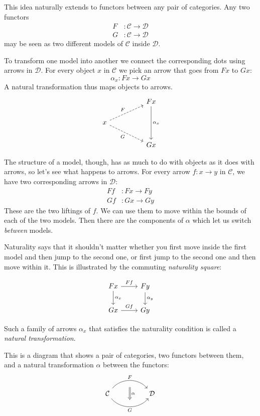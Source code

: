 \documentclass[DaoFP]{subfiles}
\begin{document}
This idea naturally extends to functors between any pair of categories. Any two functors
\begin{align*}
F &\colon \mathcal{C} \to \mathcal{D} \\
G &\colon \mathcal{C} \to \mathcal{D}
\end{align*}
may be seen as two different models of $\mathcal{C}$ inside $\mathcal{D}$. 

To transform one model into another we connect the corresponding dots using arrows in $\mathcal{D}$. For every object $x$ in $\mathcal{C}$ we pick an arrow that goes from $F x$ to $G x$:
\[ \alpha_x \colon F x \to G x \]
A natural transformation thus maps objects to arrows.
\[
 \begin{tikzcd}
 && F x
 \arrow[dd, "\alpha_x"]
 \\
 x
 \arrow[rru, dashed, "F"]
 \arrow[rrd, dashed, "G"']
 \\
 && G x
 \end{tikzcd}
\]


The structure of a model, though, has as much to do with objects as it does with arrows, so let's see what happens to arrows. For every arrow $f \colon x \to y$ in $\mathcal{C}$, we have two corresponding arrows in $\mathcal{D}$:
\begin{align*}
 F f &\colon F x \to F y \\
G f &\colon G x \to G y 
\end{align*}
These are the two liftings of $f$. We can use them to move within the bounds of each of the two models. Then there are the components of $\alpha$ which let us switch \emph{between} models. 

Naturality says that it shouldn't matter whether you first move inside the first model and then jump to the second one, or first jump to the second one and then move within it. This is illustrated by the commuting \emph{naturality square}:

\[
 \begin{tikzcd}
 F x
 \arrow[d, "\alpha_x"]
 \arrow[r, "F f"]
 &
F y
  \arrow[d, "\alpha_y"]
 \\
G x
 \arrow[r, "G f"]
& G y
 \end{tikzcd}
\]

Such a family of arrows $\alpha_x$ that satisfies the naturality condition is called a \emph{natural transformation}.

This is a diagram that shows a pair of categories, two functors between them, and a natural transformation $\alpha$ between the functors:
\[
\begin{tikzcd}[column sep=huge]
\mathcal{C}
  \arrow[bend left=50, r, "F", ""{name=U, below}]
  \arrow[bend right=50, r, "G"', ""{name=D, above}]
&
\mathcal{D}
\arrow[Rightarrow, from=U, to=D, "\alpha", shorten <=5pt, shorten >=5pt]
\end{tikzcd}\]
\end{document}
